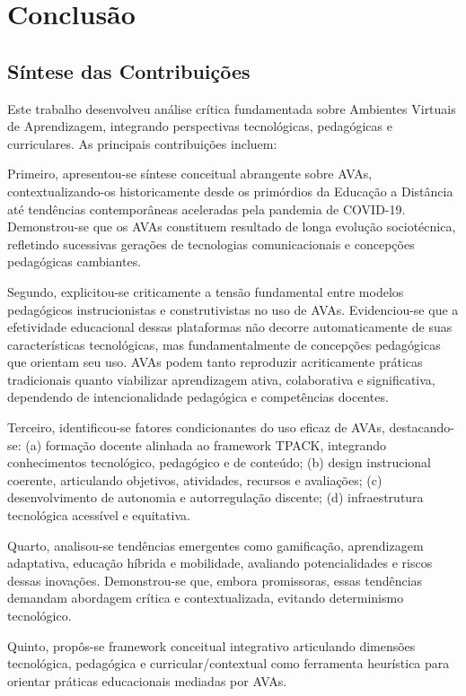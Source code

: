 \documentclass[portuguese]{sbc2025}%
\begin{document}
\section{Conclusão}
\label{sec:conclusao}

\subsection{Síntese das Contribuições}

Este trabalho desenvolveu análise crítica fundamentada sobre Ambientes Virtuais de Aprendizagem, integrando perspectivas tecnológicas, pedagógicas e curriculares. As principais contribuições incluem:

Primeiro, apresentou-se síntese conceitual abrangente sobre AVAs, contextualizando-os historicamente desde os primórdios da Educação a Distância até tendências contemporâneas aceleradas pela pandemia de COVID-19. Demonstrou-se que os AVAs constituem resultado de longa evolução sociotécnica, refletindo sucessivas gerações de tecnologias comunicacionais e concepções pedagógicas cambiantes.

Segundo, explicitou-se criticamente a tensão fundamental entre modelos pedagógicos instrucionistas e construtivistas no uso de AVAs. Evidenciou-se que a efetividade educacional dessas plataformas não decorre automaticamente de suas características tecnológicas, mas fundamentalmente de concepções pedagógicas que orientam seu uso. AVAs podem tanto reproduzir acriticamente práticas tradicionais quanto viabilizar aprendizagem ativa, colaborativa e significativa, dependendo de intencionalidade pedagógica e competências docentes.

Terceiro, identificou-se fatores condicionantes do uso eficaz de AVAs, destacando-se: (a) formação docente alinhada ao framework TPACK, integrando conhecimentos tecnológico, pedagógico e de conteúdo; (b) design instrucional coerente, articulando objetivos, atividades, recursos e avaliações; (c) desenvolvimento de autonomia e autorregulação discente; (d) infraestrutura tecnológica acessível e equitativa.

Quarto, analisou-se tendências emergentes como gamificação, aprendizagem adaptativa, educação híbrida e mobilidade, avaliando potencialidades e riscos dessas inovações. Demonstrou-se que, embora promissoras, essas tendências demandam abordagem crítica e contextualizada, evitando determinismo tecnológico.

Quinto, propôs-se framework conceitual integrativo articulando dimensões tecnológica, pedagógica e curricular/contextual como ferramenta heurística para orientar práticas educacionais mediadas por AVAs.
\end{document}
